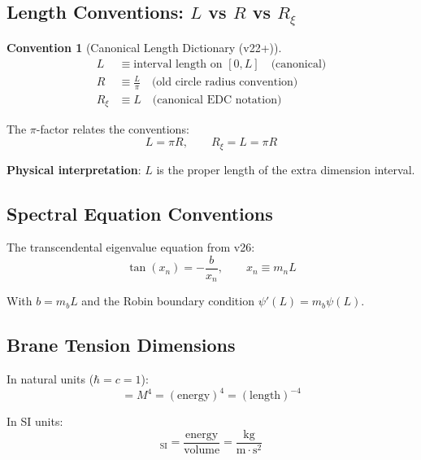 \documentclass[11pt,a4paper]{article}
\newcommand{\Rxi}{R_\xi}
\newcommand{\mb}{m_b}
\theoremstyle{definition}
\newtheorem{convention}{Convention}[section]
\theoremstyle{plain}
\theoremstyle{remark}
\begin{document}
\subsection{Length Conventions: $L$ vs $R$ vs $\Rxi$}
\label{sec:length-conventions}

\begin{convention}[Canonical Length Dictionary (v22+)]
\label{conv:length-dict}
\begin{align}
L &\equiv \text{interval length on } [0, L] \quad \text{(canonical)} \label{eq:L-def} \\
R &\equiv \frac{L}{\pi} \quad \text{(old circle radius convention)} \label{eq:R-def} \\
\Rxi &\equiv L \quad \text{(canonical EDC notation)} \label{eq:Rxi-def}
\end{align}
\end{convention}

The $\pi$-factor relates the conventions:
\begin{equation}
L = \pi R, \qquad \Rxi = L = \pi R
\label{eq:pi-factor}
\end{equation}

\textbf{Physical interpretation}: $L$ is the proper length of the extra dimension interval.

\subsection{Spectral Equation Conventions}

The transcendental eigenvalue equation from v26:
\begin{equation}
\tan(x_n) = -\frac{b}{x_n}, \qquad x_n \equiv m_n L
\label{eq:spectral-eq}
\end{equation}

With $b = \mb L$ and the Robin boundary condition $\psi'(L) = \mb\psi(L)$.

\subsection{Brane Tension Dimensions}

In natural units ($\hbar = c = 1$):
\begin{equation}
[\sigma] = M^4 = (\text{energy})^4 = (\text{length})^{-4}
\label{eq:sigma-dim-natural}
\end{equation}

In SI units:
\begin{equation}
[\sigma]_{\text{SI}} = \frac{\text{energy}}{\text{volume}} = \frac{\text{kg}}{\text{m} \cdot \text{s}^2}
\label{eq:sigma-dim-SI}
\end{equation}
\end{document}
